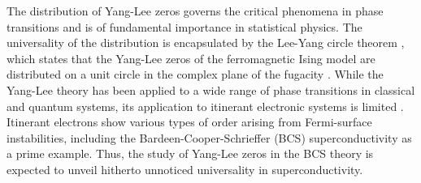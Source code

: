 \documentclass[aps,prl,twocolumn,superscriptaddress]{revtex4-1}
\begin{document}
The distribution of Yang-Lee zeros governs the critical phenomena in phase transitions \cite{Fisher1965,Fisher:1978vn} and is of fundamental importance in statistical physics. The universality of the distribution is encapsulated by the Lee-Yang circle theorem \cite{PhysRev.87.404,PhysRev.87.410}, which states that the Yang-Lee zeros of the ferromagnetic Ising model are distributed on a unit circle in the complex plane of the fugacity \cite{Simon:1973tr,Newman:1974wi,Lieb:1981vb,Kortman:1971tw}. While the Yang-Lee theory has been applied to a wide range of phase transitions in classical \cite{PhysRevLett.84.4794,PhysRevLett.84.814,PhysRevLett.89.080601,PhysRevLett.110.248101} and quantum \cite{Gehlen_1991,Sumaryada:2007uu,PhysRevB.53.7704,Matsumoto2020,PhysRevResearch.3.033206,PhysRevB.106.054402,PhysRevE.96.032116,PhysRevX.11.041018,PhysRevE.96.032116,Fredrik2023,PhysRevLett.131.080403} systems, its application to itinerant electronic systems is limited \cite{Sumaryada:2007uu,PhysRevB.53.7704}. Itinerant electrons show various types of order arising from Fermi-surface instabilities, including the Bardeen-Cooper-Schrieffer (BCS) superconductivity \cite{Bardeen:1957tx} as a prime example. Thus, the study of Yang-Lee zeros in the BCS theory is expected to unveil hitherto unnoticed universality in superconductivity.
\end{document}
